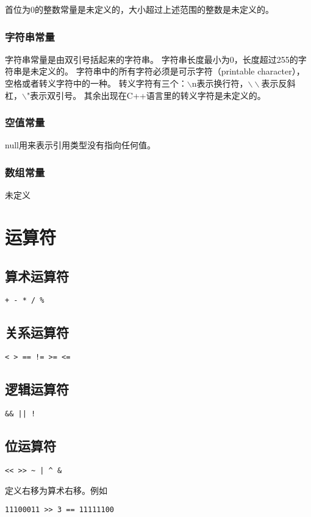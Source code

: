 \documentclass[twocolumn]{article}
\begin{document}
首位为0的整数常量是未定义的，大小超过上述范围的整数是未定义的。

\subsubsection{字符串常量}
字符串常量是由双引号括起来的字符串。
字符串长度最小为0，长度超过255的字符串是未定义的。
字符串中的所有字符必须是可示字符（printable character），空格或者转义字符中的一种。
转义字符有三个：$\backslash$n表示换行符，$\backslash\backslash$表示反斜杠，$\backslash$"表示双引号。
其余出现在C++语言里的转义字符是未定义的。

\subsubsection{空值常量}

null用来表示引用类型没有指向任何值。

\subsubsection{数组常量}
未定义

\section{运算符}

\subsection{算术运算符}
\begin{verbatim}
+ - * / %
\end{verbatim}
\subsection{关系运算符}
\begin{verbatim}
< > == != >= <=
\end{verbatim}
\subsection{逻辑运算符}
\begin{verbatim}
&& || !
\end{verbatim}

\subsection{位运算符}
\begin{verbatim}
<< >> ~ | ^ &
\end{verbatim}
定义右移为算术右移。例如
\begin{verbatim}
11100011 >> 3 == 11111100
\end{verbatim}
\end{document}
